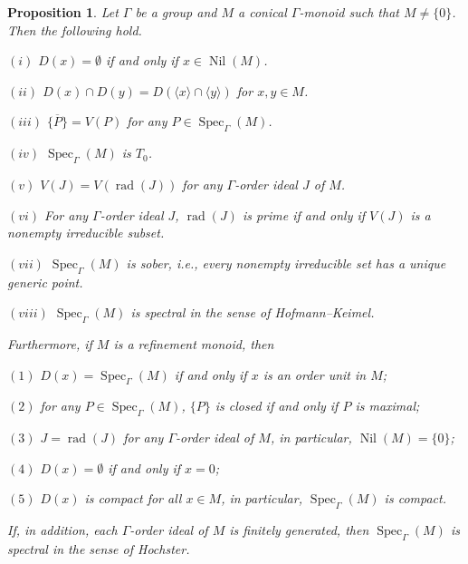 \documentclass[a4paper,reqno,12pt]{amsart}
\numberwithin{equation}{section}
\newtheorem{prop}[thm]{Proposition}
\theoremstyle{definition}
\theoremstyle{remark}
\newcommand{\rad}{\operatorname{rad}}
\newcommand{\nil}{\operatorname{Nil}}
\newcommand{\Spec}{\operatorname{Spec}}
\begin{document}
\begin{prop}\label{pro basic facts about basic open sets}
Let $\Gamma$ be a group and $M$ a conical $\Gamma$-monoid such that $M\neq \{0\}$. Then the following hold.

$(i)$ $D(x)=\emptyset$ if and only if $x\in \nil(M)$.

$(ii)$ $D(x)\cap D(y)=D(\langle x\rangle \cap \langle y\rangle)$ for $x,y\in M$.

$(iii)$ $\overline{\{P\}}=V(P)$ for any $P\in \Spec_\Gamma(M)$.

$(iv)$ $\Spec_\Gamma(M)$ is $T_0$.

$(v)$ $V(J)=V(\rad(J))$ for any $\Gamma$-order ideal $J$ of $M$.

$(vi)$ For any $\Gamma$-order ideal $J$, $\rad(J)$ is prime if and only if $V(J)$ is a nonempty irreducible subset.

$(vii)$ $\Spec_\Gamma(M)$ is sober, i.e., every nonempty irreducible set has a unique generic point.

$(viii)$ $\Spec_\Gamma(M)$ is spectral in the sense of Hofmann--Keimel.

Furthermore, if $M$ is a refinement monoid, then 

$(1)$ $D(x)=\Spec_\Gamma(M)$ if and only if $x$ is an order unit in $M$;

$(2)$ for any $P\in \Spec_\Gamma(M)$, $\{P\}$ is closed if and only if $P$ is maximal;

$(3)$ $J=\rad(J)$ for any $\Gamma$-order ideal of $M$, in particular, $\nil(M)=\{0\}$;

$(4)$ $D(x)=\emptyset$ if and only if $x=0$;

$(5)$ $D(x)$ is compact for all $x\in M$, in particular, $\Spec_\Gamma(M)$ is compact. 

If, in addition, each $\Gamma$-order ideal of $M$ is finitely generated, then $\Spec_\Gamma(M)$ is spectral in the sense of Hochster. 
\end{prop}
\end{document}
